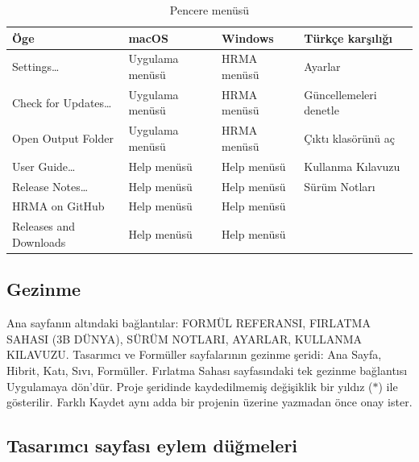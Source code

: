 \documentclass[11pt,a4paper]{article}
\newcommand{\ui}[1]{\textsf{#1}}
\begin{document}
\begin{table}[H]
\centering\small
\caption{Pencere menüsü}\label{tab:menu}
\begin{tabular}{@{}>{\raggedright\arraybackslash}p{4.4cm}>{\raggedright\arraybackslash}p{3.6cm}>{\raggedright\arraybackslash}p{3.6cm}>{\raggedright\arraybackslash}p{4.0cm}@{}}
\toprule
\textbf{Öge} & \textbf{macOS} & \textbf{Windows} & \textbf{Türkçe karşılığı} \\
\midrule
\ui{Settings\ldots} & Uygulama menüsü & \ui{HRMA} menüsü & Ayarlar \\
\ui{Check for Updates\ldots} & Uygulama menüsü & \ui{HRMA} menüsü & Güncellemeleri denetle \\
\ui{Open Output Folder} & Uygulama menüsü & \ui{HRMA} menüsü & Çıktı klasörünü aç \\
\ui{User Guide\ldots} & \ui{Help} menüsü & \ui{Help} menüsü & Kullanma Kılavuzu \\
\ui{Release Notes\ldots} & \ui{Help} menüsü & \ui{Help} menüsü & Sürüm Notları \\
\ui{HRMA on GitHub} & \ui{Help} menüsü & \ui{Help} menüsü & \\
\ui{Releases and Downloads} & \ui{Help} menüsü & \ui{Help} menüsü & \\
\bottomrule
\end{tabular}
\end{table}

\subsection{Gezinme}

Ana sayfanın altındaki bağlantılar: \ui{FORMÜL REFERANSI}, \ui{FIRLATMA SAHASI
(3B DÜNYA)}, \ui{SÜRÜM NOTLARI}, \ui{AYARLAR}, \ui{KULLANMA KILAVUZU}.
Tasarımcı ve Formüller sayfalarının gezinme şeridi: Ana Sayfa, Hibrit, Katı,
Sıvı, Formüller. Fırlatma Sahası sayfasındaki tek gezinme bağlantısı
\ui{Uygulamaya dön}'dür. Proje şeridinde kaydedilmemiş değişiklik bir yıldız
($*$) ile gösterilir. \ui{Farklı Kaydet} aynı adda bir projenin üzerine
yazmadan önce onay ister.

\subsection{Tasarımcı sayfası eylem düğmeleri}
\end{document}

